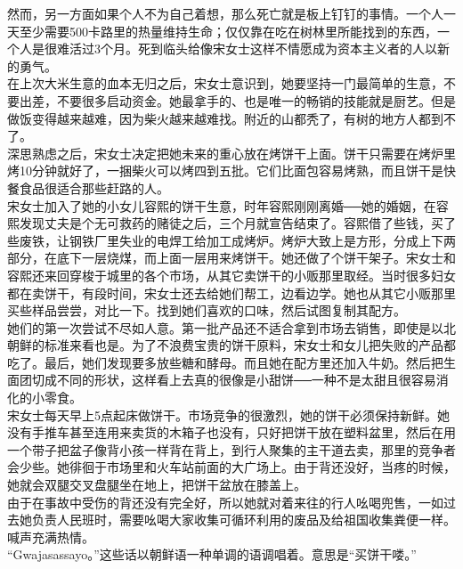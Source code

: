 \begin{multicols}{\theparacolNo}
然而，另一方面如果个人不为自己着想，那么死亡就是板上钉钉的事情。一个人一天至少需要500卡路里的热量维持生命；仅仅靠在吃在树林里所能找到的东西，一个人是很难活过3个月。死到临头给像宋女士这样不情愿成为资本主义者的人以新的勇气。\\

在上次大米生意的血本无归之后，宋女士意识到，她要坚持一门最简单的生意，不要出差，不要很多启动资金。她最拿手的、也是唯一的畅销的技能就是厨艺。但是做饭变得越来越难，因为柴火越来越难找。附近的山都秃了，有树的地方人都到不了。\\

深思熟虑之后，宋女士决定把她未来的重心放在烤饼干上面。饼干只需要在烤炉里烤10分钟就好了，一捆柴火可以烤四到五批。它们比面包容易烤熟，而且饼干是快餐食品很适合那些赶路的人。\\

宋女士加入了她的小女儿容熙的饼干生意，时年容熙刚刚离婚──她的婚姻，在容熙发现丈夫是个无可救药的赌徒之后，三个月就宣告结束了。容熙借了些钱，买了些废铁，让钢铁厂里失业的电焊工给加工成烤炉。烤炉大致上是方形，分成上下两部分，在底下一层烧煤，而上面一层用来烤饼干。她还做了个饼干架子。宋女士和容熙还来回穿梭于城里的各个市场，从其它卖饼干的小贩那里取经。当时很多妇女都在卖饼干，有段时间，宋女士还去给她们帮工，边看边学。她也从其它小贩那里买些样品尝尝，对比一下。找到她们喜欢的口味，然后试图复制其配方。\\

她们的第一次尝试不尽如人意。第一批产品还不适合拿到市场去销售，即使是以北朝鲜的标准来看也是。为了不浪费宝贵的饼干原料，宋女士和女儿把失败的产品都吃了。最后，她们发现要多放些糖和酵母。而且她在配方里还加入牛奶。然后把生面团切成不同的形状，这样看上去真的很像是小甜饼──一种不是太甜且很容易消化的小零食。\\

宋女士每天早上5点起床做饼干。市场竞争的很激烈，她的饼干必须保持新鲜。她没有手推车甚至连用来卖货的木箱子也没有，只好把饼干放在塑料盆里，然后在用一个带子把盆子像背小孩一样背在背上，到行人聚集的主干道去卖，那里的竞争者会少些。她徘徊于市场里和火车站前面的大广场上。由于背还没好，当疼的时候，她就会双腿交叉盘腿坐在地上，把饼干盆放在膝盖上。\\

由于在事故中受伤的背还没有完全好，所以她就对着来往的行人吆喝兜售，一如过去她负责人民班时，需要吆喝大家收集可循环利用的废品及给祖国收集粪便一样。喊声充满热情。\\

“Gwajasassayo。”这些话以朝鲜语一种单调的语调唱着。意思是“买饼干喽。”\\


\end{multicols}

